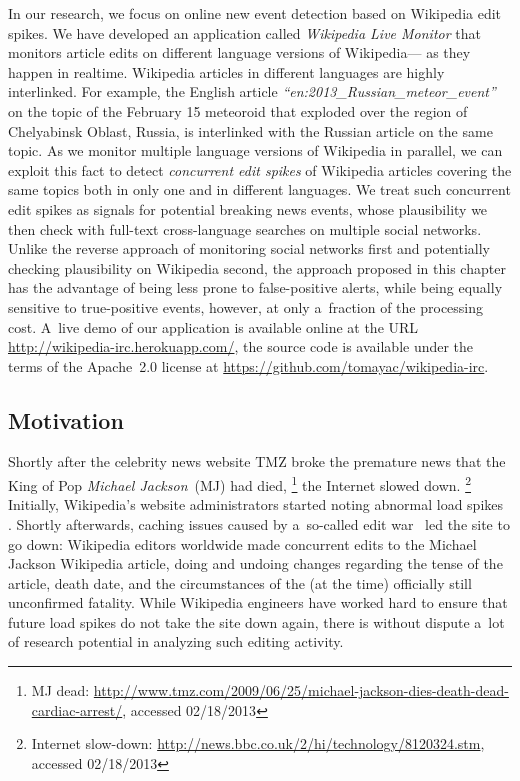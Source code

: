 In our research, we focus on online new event detection based on Wikipedia edit spikes.
We have developed an application called \emph{Wikipedia Live Monitor}
that monitors article edits on different language versions of Wikipedia---%
as they happen in realtime.
Wikipedia articles in different languages are highly interlinked.
For example, the English article \emph{``en:2013\_Russian\_meteor\_event''}
on the topic of the February 15 meteoroid
that exploded over the region of Chelyabinsk Oblast, Russia,
is interlinked with 
the Russian article on the same topic.
As we monitor multiple language versions of Wikipedia in parallel,
we can exploit this fact to detect \emph{concurrent edit spikes}
of Wikipedia articles covering the same topics
both in only one and in different languages.
We treat such concurrent edit spikes as signals
for potential breaking news events, whose plausibility we then check 
with full-text cross-language searches on multiple social networks.
Unlike the reverse approach of monitoring social networks first
and potentially checking plausibility on Wikipedia second,
the approach proposed in this chapter has the advantage of
being less prone to false-positive alerts, while being equally sensitive
to true-positive events, however, at only a~fraction of the processing cost.
A~live demo of our application is available online
at the URL \url{http://wikipedia-irc.herokuapp.com/},
the source code is available
under the terms of the Apache~2.0 license at 
\url{https://github.com/tomayac/wikipedia-irc}.

\subsection{Motivation}

Shortly after the celebrity news website TMZ
broke the premature news that the King of Pop \emph{Michael Jackson}~(MJ) had died,%
\footnote{MJ dead: \url{http://www.tmz.com/2009/06/25/michael-jackson-dies-death-dead-cardiac-arrest/},
accessed 02/18/2013}
the Internet slowed down.%
\footnote{Internet slow-down: \url{http://news.bbc.co.uk/2/hi/technology/8120324.stm},
accessed 02/18/2013}
Initially, Wikipedia's website administrators started noting abnormal load spikes~%
\cite{vibber2009currentevents}. Shortly afterwards, caching issues
caused by a~so-called edit war~\cite{beaumont2009editwar} led the site to go down:
Wikipedia editors worldwide made concurrent edits
to the Michael Jackson Wikipedia article, doing and undoing changes
regarding the tense of the article, death date,
and the circumstances of the (at the time) officially still unconfirmed fatality.
While Wikipedia engineers have worked hard
to ensure that future load spikes
do not take the site down again, there is without dispute a~lot of research potential
in analyzing such editing activity.

